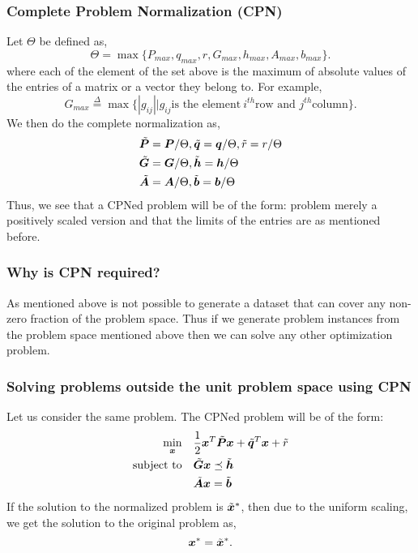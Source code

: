 \documentclass{article} %
\begin{document}
\subsubsection{Complete Problem Normalization (CPN)}
   Let $\Theta$ be defined as,
   \[
   \Theta = \max\{P_{max}, q_{max}, r, G_{max}, h_{max}, A_{max}, b_{max}\}.
   \]
   where each of the element of the set above is the maximum of absolute values of the entries of a matrix or a vector they belong to. For example,
   \[
   G_{max} \overset{\Delta}{=} \max\{|g_{ij}|| g_{ij} \text{is the element}\ i^{th} \text{row and } j^{th} \text{column}\}.
   \]  
   We then do the complete normalization as,
   \begin{subequations}
      \begin{align}
         \tilde{{\bm{P}}} &= {\bm{P}} / \Theta, \tilde{{\bm{q}}} = {\bm{q}} / \Theta, \tilde{r} = r / \Theta \\
         \tilde{{\bm{G}}} &= {\bm{G}} / \Theta, \tilde{{\bm{h}}} = {\bm{h}} / \Theta\\ 
         \tilde{{\bm{A}}} &= {\bm{A}} / \Theta, \tilde{{\bm{b}}} = {\bm{b}} / \Theta
      \end{align}
   \end{subequations}
   Thus, we see that a CPNed problem will be of the form: problem merely a positively scaled version and that the limits of the entries are as mentioned before. 
   
   \subsubsection{Why is CPN required?}
   As mentioned above is not possible to generate a dataset that can cover any non-zero fraction of the problem space. Thus if we generate problem instances from the problem space mentioned above then we can solve any other optimization problem.  
   
   \subsubsection{Solving problems outside the unit problem space using CPN}
   
   Let us consider the same problem. The CPNed problem will be of the form: 
   \begin{subequations}
      \begin{align}
         \min_{{\bm{x}}} \quad &\frac{1}{2}{\bm{x}}^T \tilde{{\bm{P}}} {\bm{x}} + \tilde{{\bm{q}}}^T {\bm{x}} + \tilde{r} \\
         \text{subject to} \quad &\tilde{{\bm{G}}} {\bm{x}} \preceq \tilde{{\bm{h}}} \\
         \quad &\tilde{{\bm{A}}} {\bm{x}} = \tilde{{\bm{b}}}  
      \end{align}
   \end{subequations}
   If the solution to the normalized problem is $\tilde{{\bm{x}}}^*$, then due to the uniform scaling, we get the solution to the original problem as, \[
   {{\bm{x}}}^* = \tilde{{\bm{x}}}^*.
   \]
\end{document}
